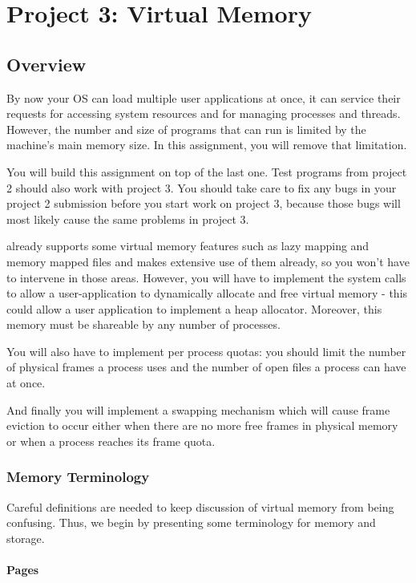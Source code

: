\chapter{Project 3: Virtual Memory}

\section{Overview}

By now your OS can load multiple user applications at once, it can service their requests for
accessing system resources and for managing processes and threads. However, the number and size of
programs that can run is limited by the machine's main memory size. In this assignment, you will
remove that limitation.

You will build this assignment on top of the last one. Test programs from project 2 should also work
with project 3. You should take care to fix any bugs in your project 2 submission before you start
work on project 3, because those bugs will most likely cause the same problems in project 3.

\projectname already supports some virtual memory features such as lazy mapping and memory mapped
files and makes extensive use of them already, so you won't have to intervene in those areas.
However, you will have to implement the system calls to allow a user-application to dynamically
allocate and free virtual memory - this could allow a user application to implement a heap allocator.
Moreover, this memory must be shareable by any number of processes.

You will also have to implement per process quotas: you should limit the number of physical frames
a process uses and the number of open files a process can have at once.

And finally you will implement a swapping mechanism which will cause frame eviction to occur either 
when there are no more free frames in physical memory or when a process reaches its frame quota.

\subsection{Memory Terminology}
Careful definitions are needed to keep discussion of virtual memory from being confusing. Thus, we
begin by presenting some terminology for memory and storage.

\subsubsection{Pages}

